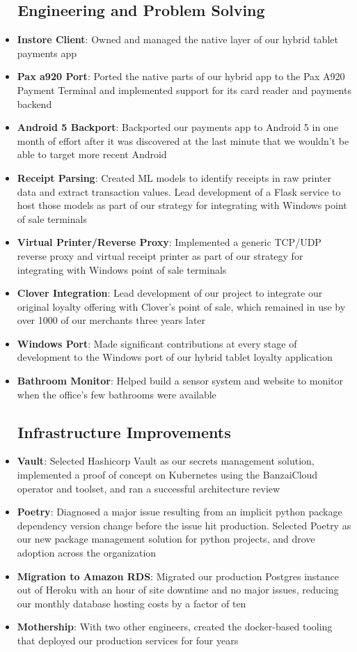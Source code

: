 \documentclass[a4paper,20pt]{article}
\newcommand{\resumeItem}[2]{
  \item\small{
    \textbf{#1}{: #2 \vspace{-2pt}}
  }
}
\newcommand{\resumeItemListStart}{\begin{itemize}}
\newcommand{\resumeItemListEnd}{\end{itemize}\vspace{-5pt}}
\begin{document}
    \subsection{~~Engineering and Problem Solving}
      \resumeItemListStart
        \resumeItem{Instore Client}{Owned and managed the native layer of our hybrid tablet payments app}
        \resumeItem{Pax a920 Port}{Ported the native parts of our hybrid app to the Pax A920 Payment Terminal and implemented support for its card reader and payments backend}
        \resumeItem{Android 5 Backport}{Backported our payments app to Android 5 in one month of effort after it was discovered at the last minute that we wouldn't be able to target more recent Android}
        \resumeItem{Receipt Parsing}{Created ML models to identify receipts in raw printer data and extract transaction values.  Lead development of a Flask service to host those models as part of our strategy for integrating with Windows point of sale terminals}
        \resumeItem{Virtual Printer/Reverse Proxy}{Implemented a generic TCP/UDP reverse proxy and virtual receipt printer as part of our strategy for integrating with Windows point of sale terminals}
        \resumeItem{Clover Integration}{Lead development of our project to integrate our original loyalty offering with Clover's point of sale, which remained in use by over 1000 of our merchants three years later}
        \resumeItem{Windows Port}{Made significant contributions at every stage of development to the Windows port of our hybrid tablet loyalty application}
        \resumeItem{Bathroom Monitor}{Helped build a sensor system and website to monitor when the office's few bathrooms were available}
      \resumeItemListEnd

    \subsection{~~Infrastructure Improvements}
      \resumeItemListStart
        \resumeItem{Vault}{Selected Hashicorp Vault as our secrets management solution, implemented a proof of concept on Kubernetes using the BanzaiCloud operator and toolset, and ran a successful architecture review}
        \resumeItem{Poetry}{Diagnosed a major issue resulting from an implicit python package dependency version change before the issue hit production.  Selected Poetry as our new package management solution for python projects, and drove adoption across the organization}
        \resumeItem{Migration to Amazon RDS}{Migrated our production Postgres instance out of Heroku with an hour of site downtime and no major issues, reducing our monthly database hosting costs by a factor of ten}
        \resumeItem{Mothership}{With two other engineers, created the docker-based tooling that deployed our production services for four years}
      \resumeItemListEnd
\end{document}
